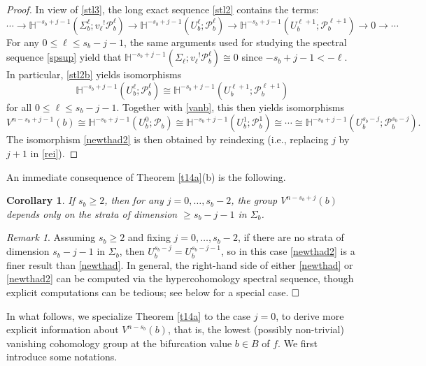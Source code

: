 \documentclass[12pt,leqno,twoside]{amsart}
\newtheorem{corollary}[theorem]{Corollary}
\theoremstyle{remark}
\newtheorem{remark}[theorem]{\sc Remark}
\theoremstyle{remark}
\theoremstyle{definition}
\theoremstyle{remark}
\theoremstyle{remark}
\theoremstyle{remark}
\numberwithin{equation}{section}  %
\def\be{\begin{equation}}
\def\ee{\end{equation}}
\newcommand{\cP}{\mathcal{P}}
\newcommand{\bH}{\mathbb{H}}
\begin{document}
\begin{proof}
In view of \eqref{stl3}, the long exact sequence \eqref{stl2} contains the terms:
\be\label{stl2b} \cdots \to \bH^{-s_b+j-1}(\Sigma_b^\ell; {v_\ell}^!\cP_b^\ell) \to \bH^{-s_b+j-1}(U_b^\ell;\cP_b^\ell) \to   \bH^{-s_b+j-1}(U_b^{\ell+1};\cP_b^{\ell+1}) \to 0 \to \cdots\ee
For any $0 \leq \ell \leq s_b-j-1$, the same arguments used for studying the spectral sequence \eqref{spsup} yield that $\bH^{-s_b+j-1}(\Sigma_\ell; {v_\ell}^!\cP_b^\ell) \cong 0$ since $-s_b+j-1<-\ell$. In particular, \eqref{stl2b} yields isomorphisms
$$\bH^{-s_b+j-1}(U_b^\ell;\cP_b^\ell) \cong   \bH^{-s_b+j-1}(U_b^{\ell+1};\cP_b^{\ell+1}) $$
for all $0 \leq \ell \leq s_b-j-1$. Together with \eqref{vanb}, this then yields isomorphisms
\be\label{rei}V^{n-s_b+j-1}(b) \cong \bH^{-s_b+j-1}(U_b^0;\cP_b) \cong  \bH^{-s_b+j-1}(U_b^1;\cP_b^1) \cong \cdots \cong  \bH^{-s_b+j-1}(U_b^{s_b-j};\cP_b^{s_b-j}).\ee
The isomorphism \eqref{newthad2} is then obtained by reindexing (i.e., replacing $j$ by $j+1$ in \eqref{rei}).
\end{proof}

An immediate consequence of Theorem \ref{t14a}(b) is the following.  
\begin{corollary}\label{c2.2}
If $s_b \geq 2$, then for any $j=0,\ldots, s_b-2$, the group $V^{n-s_b+j}(b)$ depends only on the strata of dimension $\geq s_b-j-1$ in $\Sigma_b$.
\end{corollary}

\begin{remark}\label{dif} 
Assuming $s_b\geq 2$ and fixing  $j=0,\ldots, s_b-2$, if there are no strata of dimension $s_b-j-1$ in $\Sigma_b$, then $U_b^{s_b-j}=U_b^{s_b-j-1}$, so in this case \eqref{newthad2} is a finer result than \eqref{newthad}. In general, the right-hand side of either \eqref{newthad} or \eqref{newthad2} can be computed via the hypercohomology spectral sequence, though explicit computations can be tedious; see below for a special case. $\hfill\square$ \end{remark}

In what follows, we specialize Theorem \ref{t14a} to the case $j=0$, to derive more explicit information about $V^{n-s_b}(b)$, that is, the lowest (possibly non-trivial) vanishing cohomology group at the bifurcation value $b \in B$ of $f$.
We first introduce some notations.
\end{document}
